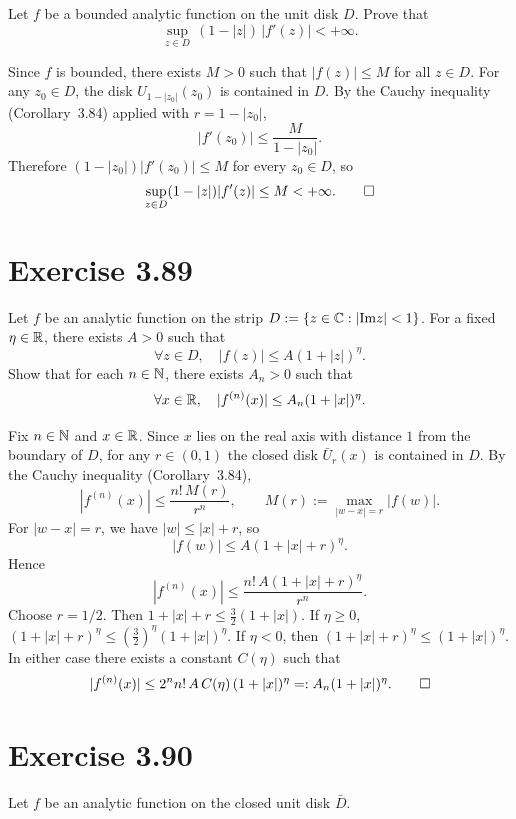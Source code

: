 \documentclass{article}
\begin{document}
Let $f$ be a bounded analytic function on the unit disk $D$.
Prove that
\[
  \sup_{z \in D}\,(1 - |z|)\,|f'(z)| < +\infty.
\]

\begin{solution}
  Since $f$ is bounded, there exists $M > 0$ such that
  $|f(z)| \le M$ for all $z \in D$.
  For any $z_0 \in D$, the disk
  $U_{1-|z_0|}(z_0)$ is contained in $D$.
  By the Cauchy inequality (Corollary~3.84) applied with
  $r = 1 - |z_0|$,
  \[
    |f'(z_0)| \le \frac{M}{1-|z_0|}.
  \]
  Therefore $(1-|z_0|)|f'(z_0)| \le M$ for every $z_0 \in D$, so
  \[
    \sup_{z \in D}(1-|z|)|f'(z)| \le M < +\infty.\qedhere
  \]
\end{solution}

\section{Exercise 3.89}

Let $f$ be an analytic function on the strip
$D := \{z \in \mathbb{C} : |\mathrm{Im} z| < 1\}$.
For a fixed $\eta \in \mathbb{R}$, there exists $A > 0$ such that
\[
  \forall z \in D,\quad |f(z)| \le A(1 + |z|)^\eta.
\]
Show that for each $n \in \mathbb{N}$, there exists $A_n > 0$ such that
\[
  \forall x \in \mathbb{R},\quad |f^{(n)}(x)| \le A_n(1 + |x|)^\eta.
\]

\begin{solution}
  Fix $n \in \mathbb{N}$ and $x \in \mathbb{R}$.
  Since $x$ lies on the real axis with distance $1$ from the
  boundary of $D$, for any $r \in (0,1)$ the closed disk
  $\bar{U}_r(x)$ is contained in $D$.
  By the Cauchy inequality (Corollary~3.84),
  \[
    |f^{(n)}(x)| \le \frac{n!\,M(r)}{r^n},
    \qquad M(r) := \max_{|w-x|=r}|f(w)|.
  \]
  For $|w-x| = r$, we have $|w| \le |x| + r$, so
  \[
    |f(w)| \le A(1+|x|+r)^\eta.
  \]
  Hence
  \[
    |f^{(n)}(x)| \le \frac{n!\,A(1+|x|+r)^\eta}{r^n}.
  \]
  Choose $r = 1/2$.  Then $1+|x|+r \le \frac{3}{2}(1+|x|)$.
  If $\eta \ge 0$,
  $(1+|x|+r)^\eta \le (\frac{3}{2})^\eta(1+|x|)^\eta$.
  If $\eta < 0$, then $(1+|x|+r)^\eta \le (1+|x|)^\eta$.
  In either case there exists a constant $C(\eta)$ such that
  \[
    |f^{(n)}(x)| \le 2^n n!\,A\,C(\eta)\,(1+|x|)^\eta
    =: A_n(1+|x|)^\eta.\qedhere
  \]
\end{solution}

\section{Exercise 3.90}

Let $f$ be an analytic function on the closed unit disk $\bar{D}$.
\end{document}
